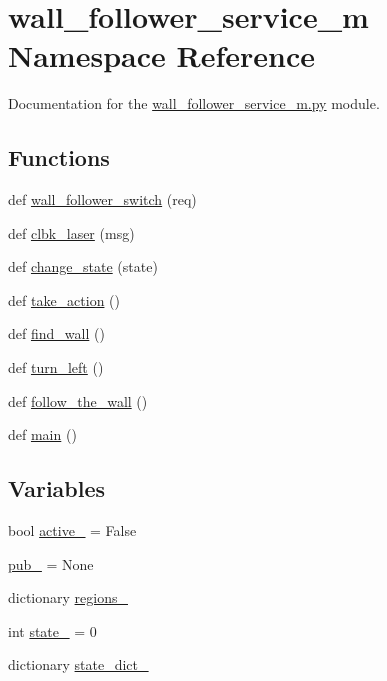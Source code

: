 \hypertarget{namespacewall__follower__service__m}{}\section{wall\+\_\+follower\+\_\+service\+\_\+m Namespace Reference}
\label{namespacewall__follower__service__m}


Documentation for the \hyperlink{wall__follower__service__m_8py}{wall\+\_\+follower\+\_\+service\+\_\+m.\+py} module.  


\subsection*{Functions}
\begin{DoxyCompactItemize}
\item 
def \hyperlink{namespacewall__follower__service__m_ae9e8abfd4154d378ce74492e3c6b8c25}{wall\+\_\+follower\+\_\+switch} (req)
\item 
def \hyperlink{namespacewall__follower__service__m_a49082932764481e168f6f3650664475c}{clbk\+\_\+laser} (msg)
\item 
def \hyperlink{namespacewall__follower__service__m_a74fa42cce94631ffe9d3f64db90d8e42}{change\+\_\+state} (state)
\item 
def \hyperlink{namespacewall__follower__service__m_a427f4720f3202355a1436b58a8faf321}{take\+\_\+action} ()
\item 
def \hyperlink{namespacewall__follower__service__m_a5ce8530e86802800bbcb8bc5a2ec49ad}{find\+\_\+wall} ()
\item 
def \hyperlink{namespacewall__follower__service__m_a384300aaec5867ae87559250968cc4ff}{turn\+\_\+left} ()
\item 
def \hyperlink{namespacewall__follower__service__m_af114875285df80b5b86d958563d9da7c}{follow\+\_\+the\+\_\+wall} ()
\item 
def \hyperlink{namespacewall__follower__service__m_a31efe8a16c4f9f8ade6f60f0b7f5a1c9}{main} ()
\end{DoxyCompactItemize}
\subsection*{Variables}
\begin{DoxyCompactItemize}
\item 
bool \hyperlink{namespacewall__follower__service__m_a3808a035405c1350e8af8bf26e364509}{active\+\_\+} = False
\item 
\hyperlink{namespacewall__follower__service__m_aa92f44d061ddf4a546602a287ea64d11}{pub\+\_\+} = None
\item 
dictionary \hyperlink{namespacewall__follower__service__m_a326b63f9d570893bead600e2b51cf3a9}{regions\+\_\+}
\item 
int \hyperlink{namespacewall__follower__service__m_abc963136b4d1de74889fcb2c0ab2bf34}{state\+\_\+} = 0
\item 
dictionary \hyperlink{namespacewall__follower__service__m_a6f7fc10e2a6a622e5c561a2b13b87acf}{state\+\_\+dict\+\_\+}
\end{DoxyCompactItemize}


